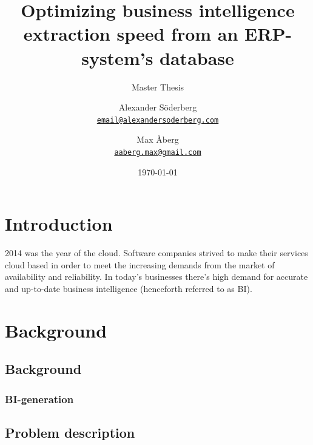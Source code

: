 \documentclass{cslthse-msc}
\author{
	Alexander Söderberg \\
	{\normalsize \href{mailto:email@alexandersoderberg.com}{\texttt{email@alexandersoderberg.com}}}
	\and
	Max Åberg \\
    {\normalsize \href{mailto:aaberg.max@gmail.com}{\texttt{aaberg.max@gmail.com}}}
}
\title{Optimizing business intelligence
extraction speed from an
ERP-system’s database}
\subtitle{Master Thesis}
\date{\today}
\begin{document}
\makefrontmatter
\chapter[Introduction]{Introduction}
2014 was the year of the cloud. Software companies strived to make their services cloud based in order to meet the increasing demands from the market of availability and reliability. 
In today's businesses there's high demand for accurate and up-to-date business intelligence (henceforth referred to as BI).

\chapter{Background}\label{sec:background}

\section{Background}

\subsection{BI-generation}

\section{Problem description}
\end{document}

